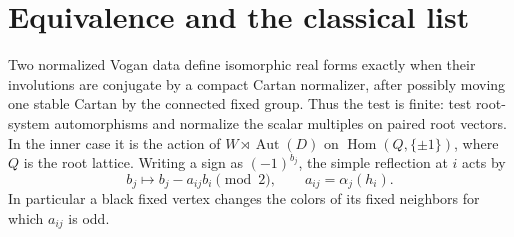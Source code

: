 \section{Equivalence and the classical list}

\begin{proposition}\label{res:J06}
Two normalized Vogan data define isomorphic real forms exactly when
their involutions are conjugate by a compact Cartan normalizer,
after possibly moving one stable Cartan by the connected fixed group.
Thus the test is finite: test root-system automorphisms and normalize
the scalar multiples on paired root vectors. In the inner case it
is the action of \(W\rtimes\operatorname{Aut}(D)\) on
\(\operatorname{Hom}(Q,\{\pm1\})\), where \(Q\) is the root lattice.
Writing a sign as \((-1)^{b_j}\), the simple reflection at \(i\) acts by
\[
 b_j\longmapsto b_j-a_{ij}b_i\pmod2,\qquad
 a_{ij}=\alpha_j(h_i).
 \tag{10.1}\label{eq:vogan-reflection}
\]
In particular a black fixed vertex changes the colors of its
fixed neighbors for which \(a_{ij}\) is odd.
\end{proposition}
